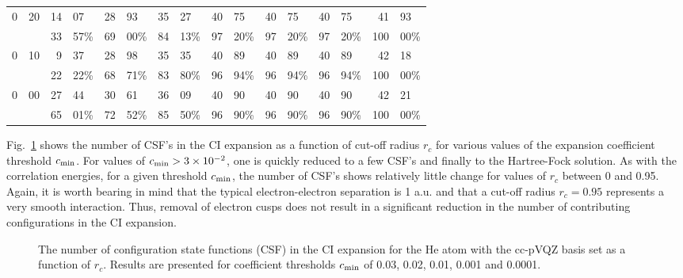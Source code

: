 \begin{table*}
\begin{center}
\begin{tabular}{*{8}{r@{.}l}}
                          0&20 &       14&07  &            28&93  &            35&27  &             40&75  &             40&75  &     40&75  &  41&93   \\
\multicolumn{2}{c}{}           &       33&57\%&            69&00\%&            84&13\% &            97&20\% &            97&20\% &    97&20\%& 100&00\% \\

                          0&10 &        9&37  &            28&98  &            35&35  &             40&89  &             40&89  &     40&89  &  42&18   \\
\multicolumn{2}{c}{}           &       22&22\%&            68&71\%&            83&80\% &            96&94\% &            96&94\% &    96&94\%& 100&00\% \\

                          0&00 &       27&44  &            30&61  &            36&09  &             40&90  &             40&90  &     40&90  &  42&21   \\
\multicolumn{2}{c}{}           &       65&01\%&            72&52\%&            85&50\% &            96&90\% &            96&90\% &    96&90\%& 100&00\% 
\end{tabular}
\end{center}
\label{tab:heccpvqz}
\end{table*}


Fig.~\ref{fig:Heccpvqz:csf} shows the number of CSF's in the CI
expansion as a function of cut-off radius $r_c$ 
for various values of the expansion coefficient threshold $c_{\rm min}$. 
For values of $c_{\rm min} > 3\times 10^{-2}$, one is quickly reduced 
to a few CSF's and finally to the Hartree-Fock solution. 
As with the correlation energies, for a given threshold $c_{\rm min}$,
the number of CSF's shows relatively little change for values of 
$r_c$ between 0 and 0.95.
Again, it is worth bearing in mind that the typical electron-electron
separation is 1 a.u. and that a cut-off radius $r_c=0.95$ represents
a very smooth interaction.
Thus, removal of electron cusps does not result in a significant 
reduction in the number of contributing configurations in the CI 
expansion.

%
%

\begin{figure}[tb]
\begin{center}
  \leavevmode
  \vspace{0.5cm}
  \caption{
    The number of configuration state functions (CSF) in the CI 
    expansion for the He atom with the cc-pVQZ basis set as a function of $r_c$. 
    Results are presented for coefficient thresholds $c_{\rm min}$ of 
    0.03, 0.02, 0.01, 0.001 and 0.0001. 
  }
  \label{fig:Heccpvqz:csf}
\end{center}
\end{figure}


